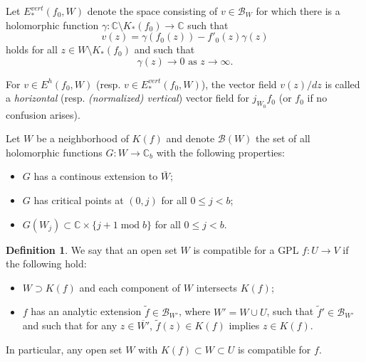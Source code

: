 \documentclass{amsart}
\numberwithin{equation}{section}
\theoremstyle{definition}
\newtheorem{definition}[theorem]{Definition}%
\theoremstyle{remark}
\DeclareMathOperator{\Mod}{mod}
\begin{document}
Let $E^{vert}_*(f_0,W)$ denote the space consisting of $v\in \mathcal{B}_W$ for which there is a holomorphic function $\gamma:\mathbb{C} \setminus K_*(f_0)\to \mathbb{C}$ such that 
\begin{equation}\label{eqn:vertical}
v(z)=\gamma(f_0(z))- f'_0(z)\gamma(z)
\end{equation}
holds for all $z\in W\setminus K_*(f_0)$ and such that
\begin{equation}\label{eqn:gamma0} 
\gamma(z)\to 0 
\mbox{ as }z\to\infty. 
\end{equation}

For $v\in E^h(f_0,W)$ (resp. $v\in E^{vert}_*(f_0, W)$), the vector field $v(z)/dz$ is called a {\em horizontal} (resp. {\em (normalized) vertical}) vector field for $j_{W_0}f_0$ (or $f_0$ if no confusion arises).




\iffalse
Let $W$ be a neighborhood of $K(f)$ and denote $\mathcal{B}(W)$ the set of all holomorphic functions $G: W \to \mathbb{C}_b$ with the following properties:
\begin{itemize}
\item $G$ has a continous extension to $\bar{W}$;
\item $G$ has critical points at $(0,j)$ for all $0\le j<b$;
\item  $G(W_j) \subset \mathbb{C} \times \{j+1 \Mod b\}$ for all $0\le j<b$.
\end{itemize}


\begin{definition} We say that an open set $W$ is compatible for a GPL $f:U\to V$ if 
the following hold:
\begin{itemize}
\item $W\supset K(f)$ and each component of $W$ intersects $K(f)$;
\item $f$ has an analytic extension $\widetilde{f}\in \mathcal{B}_{W'}$, where $W'=W\cup U$, such that $\widetilde{f}'\in \mathcal{B}_{W'}$ and such that for any $z\in \overline{W'}$, $\widetilde{f}(z)\in K(f)$ implies $z\in K(f)$. 
\end{itemize}
\end{definition}
In particular, any open set $W$ with $K(f)\subset W\subset U$ is compatible for $f$.
\end{document}
